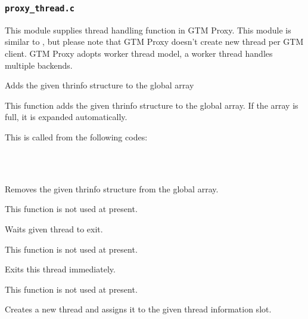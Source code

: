 
\subsubsection{\texttt{proxy\_thread.c}}

  This module supplies thread handling function in GTM Proxy.
  This module is similar to , but please note that GTM Proxy doesn't create new thread per GTM client.
  GTM Proxy adopts worker thread model, a worker thread handles multiple backends.
  
  
    Adds the given thrinfo structure to the global array
    
    This function adds the given thrinfo structure to the global array.
    If the array is full, it is expanded automatically.
    
    This is called from the following codes:
    
    \FuncRefHdr
		\\
		\\ \hline
    \FuncRefTrailor
  
  
    Removes the given thrinfo structure from the global array.
    
    This function is not used at present.
  
  
    Waits given thread to exit.
    
    This function is not used at present.
  
  
    Exits this thread immediately.
    
    This function is not used at present.
  
  
    Creates a new thread and assigns it to the given thread information slot.
    
